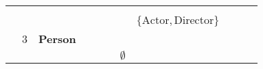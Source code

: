 \begin{table}[]
{\begin{tabular}{lllllllllll}
                          &                           &                   & \cellcolor[HTML]{FC8D59} &                                                                        &                           &                                                             &                                                                            &                                                                           &                                 &                                                                        \\
                          &                           &                   &                                                                          & \cellcolor[HTML]{FC8D59}  &                           &                                                             &                                                                            &                                                                           &                                 &                                                                        \\
                          &                           &                   &                                                                          &                                                                        &                           &                                                             & \cellcolor[HTML]{FC8D59}$\{\text{Actor}, \text{Director}\}$                &                                                                           &                                 &                                                                        \\
                          & \cellcolor[HTML]{FC8D59}3 & \textbf{Person}   &                                                                          &                                                                        &                           &                                                             &                                                                            &                                                                           &                                 &                                                                        \\
                          &                           &                   &                                                                          &                                                                        &                           & \cellcolor[HTML]{FC8D59}$\emptyset$                         &                                                                            &                                                                           &                                 &                                                                        \\

\end{tabular}}
\end{table}
